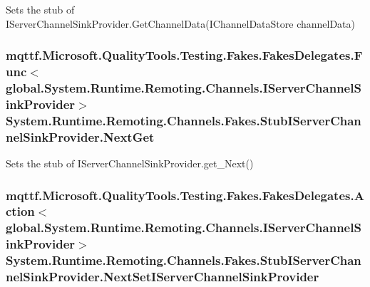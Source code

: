 Sets the stub of I\-Server\-Channel\-Sink\-Provider.\-Get\-Channel\-Data(\-I\-Channel\-Data\-Store channel\-Data)

\hypertarget{class_system_1_1_runtime_1_1_remoting_1_1_channels_1_1_fakes_1_1_stub_i_server_channel_sink_provider_ab1b5641e04b4fb02d5601dee4f0fcde2}{
\subsubsection[{Next\-Get}]{\setlength{\rightskip}{0pt plus 5cm}mqttf.\-Microsoft.\-Quality\-Tools.\-Testing.\-Fakes.\-Fakes\-Delegates.\-Func$<$global.\-System.\-Runtime.\-Remoting.\-Channels.\-I\-Server\-Channel\-Sink\-Provider$>$ System.\-Runtime.\-Remoting.\-Channels.\-Fakes.\-Stub\-I\-Server\-Channel\-Sink\-Provider.\-Next\-Get}}\label{class_system_1_1_runtime_1_1_remoting_1_1_channels_1_1_fakes_1_1_stub_i_server_channel_sink_provider_ab1b5641e04b4fb02d5601dee4f0fcde2}


Sets the stub of I\-Server\-Channel\-Sink\-Provider.\-get\-\_\-\-Next()

\hypertarget{class_system_1_1_runtime_1_1_remoting_1_1_channels_1_1_fakes_1_1_stub_i_server_channel_sink_provider_a7aca1f3dfda99d134bac38c2aa6ada5c}{
\subsubsection[{Next\-Set\-I\-Server\-Channel\-Sink\-Provider}]{\setlength{\rightskip}{0pt plus 5cm}mqttf.\-Microsoft.\-Quality\-Tools.\-Testing.\-Fakes.\-Fakes\-Delegates.\-Action$<$global.\-System.\-Runtime.\-Remoting.\-Channels.\-I\-Server\-Channel\-Sink\-Provider$>$ System.\-Runtime.\-Remoting.\-Channels.\-Fakes.\-Stub\-I\-Server\-Channel\-Sink\-Provider.\-Next\-Set\-I\-Server\-Channel\-Sink\-Provider}}\label{class_system_1_1_runtime_1_1_remoting_1_1_channels_1_1_fakes_1_1_stub_i_server_channel_sink_provider_a7aca1f3dfda99d134bac38c2aa6ada5c}


